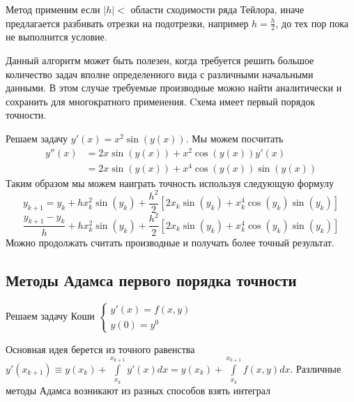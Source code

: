 Метод применим если $|h|<$ области сходимости ряда Тейлора,
иначе предлагается разбивать отрезки на подотрезки, например $h=\frac{h}{2}$,
до тех пор пока не выполнится условие.

\begin{remark}
  Данный алгоритм может быть полезен, когда требуется решить
  большое количество задач вполне определенного вида с
  различными начальными данными. В этом случае требуемые
  производные можно найти аналитически и сохранить для многократного применения.
  Cхема имеет первый порядок точности.
\end{remark}

\begin{example}
  Решаем задачу $y'(x)=x^2\sin(y(x))$. Мы можем посчитать
  \begin{align*}
    y''(x) & = 2x\sin(y(x))+x^2\cos(y(x))y'(x)      \\
           & = 2x\sin(y(x))+x^4\cos(y(x))\sin(y(x))
  \end{align*}
  Таким образом мы можем наиграть точность используя следующую формулу
  \[y_{k+1}=y_k+hx_k^2\sin(y_{k})+\frac{h^2}{2}[2x_k\sin(y_k)+x_k^4\cos(y_k)\sin(y_k)]\]
  \[\frac{y_{k+1}-y_k}{h}+hx_k^2\sin(y_{k})+\frac{h^2}{2}[2x_k\sin(y_k)+x_k^4\cos(y_k)\sin(y_k)]\]
  Можно продолжать считать производные и получать более точный результат.
\end{example}

\subsection*{Методы Адамса первого порядка точности}

Решаем задачу Коши $\begin{cases}
    y'(x)=f(x,y) \\ y(0)=y^0
  \end{cases}$

Основная идея берется из точного равенства $y'(x_{k+1})\equiv y(x_k)+\int\limits_{x_k}^{x_{k+1}}y'(x)dx=y(x_k)+\int\limits_{x_k}^{x_{k+1}}f(x,y)dx$.
Различные методы Адамса возникают из разных способов взять интеграл

